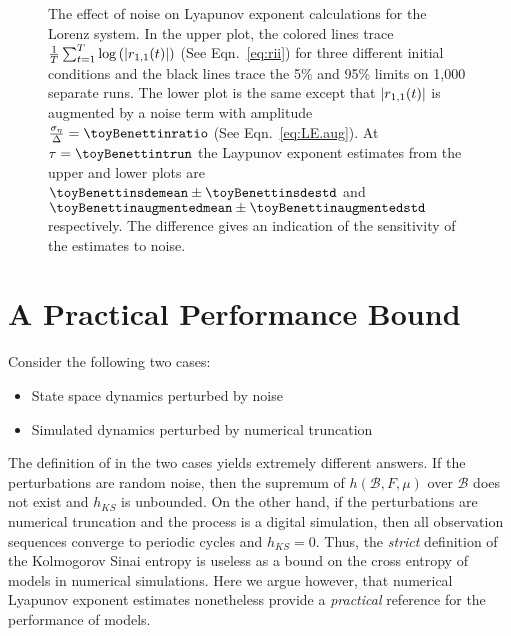 \begin{figure}[htb]
  \caption[Lyapunov exponent calculation for
  the Lorenz system.]%
  {The effect of noise on Lyapunov exponent calculations for the
    Lorenz system.  In the upper plot, the colored lines trace
    $\frac{1}{T} \sum_{t=1}^T \log\left( \left| {r_{1,1}}{(t)}
      \right| \right)$ (See Eqn.~\eqref{eq:rii}) for three different
    initial conditions and the black lines trace the 5\% and 95\%
    limits on 1,000 separate runs.  The lower plot is the same except
    that $\left| {r_{1,1}}{(t)} \right|$ is augmented by a noise term
    with amplitude $\frac{\sigma_\eta}{\Delta} = \toyBenettinratio$
    (See Eqn.~\eqref{eq:LE.aug}).  At $\tau=\toyBenettintrun$ the
    Laypunov exponent estimates from the upper and lower plots are
    $\toyBenettinsdemean \pm \toyBenettinsdestd$ and
    $\toyBenettinaugmentedmean \pm \toyBenettinaugmentedstd$
    respectively.  The difference gives an indication of the
    sensitivity of the estimates to noise.}
  \label{fig:benettin}
\end{figure}

\section{A Practical Performance Bound}
\label{sec:PracticalBound}

Consider the following two cases:
\begin{itemize}
\item State space dynamics perturbed by noise
\item Simulated dynamics perturbed by numerical truncation
\end{itemize}
The definition of  in the two cases yields
extremely different answers.  If the perturbations are random noise,
then the supremum of $h(\mathcal{B},F,\mu)$ over $\mathcal{B}$ does
not exist and $h_{KS}$ is unbounded.  On the other hand, if the
perturbations are numerical truncation and the process is a digital
simulation, then all observation sequences converge to periodic cycles
and $h_{KS} = 0$.  Thus, the \emph{strict} definition of the
Kolmogorov Sinai entropy is useless as a bound on the cross entropy of
models in numerical simulations.  Here we argue however, that
numerical Lyapunov exponent estimates nonetheless provide a
\emph{practical} reference for the performance of models.

